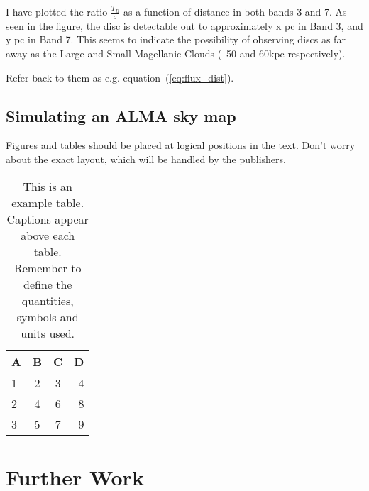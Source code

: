 \documentclass[a4paper,fleqn,usenatbib]{mnras}
\begin{document}
I have plotted the ratio $\frac{T_B}{\sigma}$ as a function of distance in both bands 3 and 7. As seen in the figure, the disc is detectable out to approximately x pc in Band 3, and y pc in Band 7. This seems to indicate the possibility of observing discs as far away as the Large and Small Magellanic Clouds (~50 and 60kpc respectively).

Refer back to them as e.g. equation~(\ref{eq:flux_dist}).

\subsection{Simulating an ALMA sky map}

Figures and tables should be placed at logical positions in the text. Don't
worry about the exact layout, which will be handled by the publishers.



\begin{table}
	\centering
	\caption{This is an example table. Captions appear above each table.
	Remember to define the quantities, symbols and units used.}
	\label{tab:example_table}
	\begin{tabular}{lccr} %
		\hline
		A & B & C & D\\
		\hline
		1 & 2 & 3 & 4\\
		2 & 4 & 6 & 8\\
		3 & 5 & 7 & 9\\
		\hline
	\end{tabular}
\end{table}


\section{Further Work}
\end{document}
